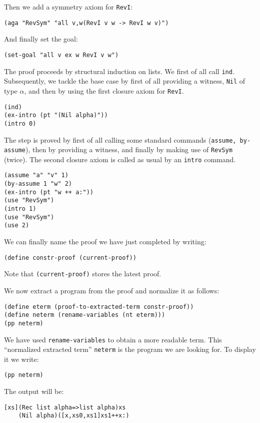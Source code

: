 \documentclass[12pt]{amsart}
\newcommand{\inquotes}[1]{``#1''}
\begin{document}
Then we add a symmetry axiom for \texttt{RevI}:
\begin{verbatim}
(aga "RevSym" "all v,w(RevI v w -> RevI w v)")
\end{verbatim}
And finally set the goal:
\begin{verbatim}
(set-goal "all v ex w RevI v w")
\end{verbatim}
The proof proceeds by structural induction on lists.  We first of all
call \texttt{ind}.  Subsequently, we tackle the base case by first of
all providing a witness, \texttt{Nil} of type $\alpha$, and then by
using the first closure axiom for \texttt{RevI}.
\begin{verbatim}
(ind)
(ex-intro (pt "(Nil alpha)"))
(intro 0)
\end{verbatim}

The step is proved by first of all calling some standard commands
(\texttt{assume, by-assume}), then by providing a witness, and
finally by making use of \texttt{RevSym} (twice).  The second closure
axiom is called as usual by an \texttt{intro} command.
\begin{verbatim}
(assume "a" "v" 1)
(by-assume 1 "w" 2)
(ex-intro (pt "w ++ a:"))
(use "RevSym")
(intro 1)
(use "RevSym")
(use 2)
\end{verbatim}

We can finally name the proof we have just completed by writing:
\begin{verbatim}
(define constr-proof (current-proof))
\end{verbatim}

Note that \texttt{(current-proof)} stores the latest proof.

We now extract a program from the proof and normalize it as follows:
\begin{verbatim}
(define eterm (proof-to-extracted-term constr-proof))
(define neterm (rename-variables (nt eterm)))
(pp neterm)
\end{verbatim}

We have used \texttt{rename-variables} to obtain a more readable term.
This \inquotes{normalized extracted term} \texttt{neterm} is the
program we are looking for.  To display it we write:
\begin{verbatim}
(pp neterm)
\end{verbatim}

The output will be:
\begin{verbatim}
[xs](Rec list alpha=>list alpha)xs
    (Nil alpha)([x,xs0,xs1]xs1++x:)
\end{verbatim}
\end{document}

